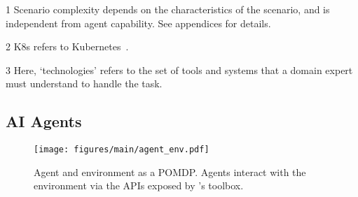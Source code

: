\begin{table*}[h]
\begin{threeparttable}
\begin{tabular}{m{}m{}m{}m{}}
            \bottomrule
        \end{tabular}
        \begin{tablenotes}
        \item[1] Scenario complexity  depends on the characteristics of the scenario, and is independent from agent capability. See appendices for details.
        \item[2] K8s refers to Kubernetes~\cite{kubernetes}.
        \item[3] Here, `technologies' refers to the set of tools and systems that a domain expert must understand to handle the task.
        \end{tablenotes}
    \end{threeparttable}
\end{table*}

\subsection{AI Agents}
\label{sec:baseline-agent}

\begin{figure}[h]
    \centering
    \texttt{[image: figures/main/agent\_env.pdf]}
    \caption{Agent and environment as a POMDP. Agents interact with the environment via the APIs exposed by \bench's toolbox.}
    \vspace{-10pt}
    \label{fig:bench-agent-POMDP}
\end{figure}













